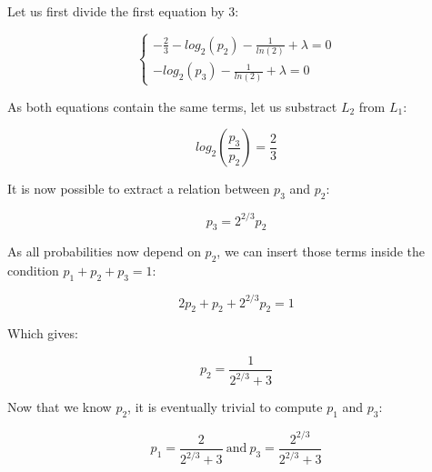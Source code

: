 \documentclass{article}
\begin{document}
Let us first divide the first equation by 3:

$$ 
\begin{cases}
- \frac{2}{3} - log_2(p_2) - \frac{1}{ln(2)} + \lambda = 0\\
-log_2(p_3) - \frac{1}{ln(2)} + \lambda = 0
\end{cases}
$$

As both equations contain the same terms, let us substract $L_2$ from $L_1$:

$$log_2(\frac{p_3}{p_2}) = \frac{2}{3}$$

It is now possible to extract a relation between $p_3$ and $p_2$:

$$ p_3 = 2^{2/3} p_2$$

As all probabilities now depend on $p_2$, we can insert those terms inside the condition $p_1 + p_2 + p_3 = 1$:

$$2 p_2 + p_2 + 2^{2/3}p_2 = 1$$

Which gives:

$$\boxed{p_2 = \frac{1}{2^{2/3}+3}}$$

Now that we know $p_2$, it is eventually trivial to compute $p_1$ and $p_3$:

$$\boxed{p_1 = \frac{2}{2^{2/3}+3}\ \text{and}\ p_3 = \frac{2^{2/3}}{2^{2/3}+3}}$$
\end{document}
